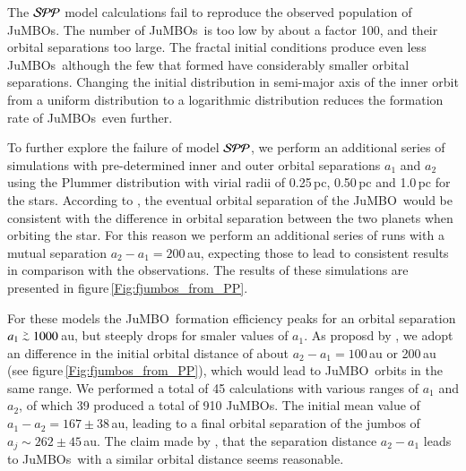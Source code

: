 \documentclass[aa]{lib/aa}
\def\apgt{\ {\raise-.5ex\hbox{$\buildrel>\over\sim$}}\ }
\newcommand{\jumbo}{\mbox{JuMBO}}
\newcommand{\jumbos}{\mbox{JuMBOs}}
\begin{document}
The ${\cal SPP}$ model calculations fail to reproduce the observed
population of \jumbos. The number of \jumbos\, is too low by about a
factor 100, and their orbital separations too large.  The fractal
initial conditions produce even less \jumbos\, although the few that
formed have considerably smaller orbital separations.  Changing the
initial distribution in semi-major axis of the inner orbit from a
uniform distribution to a logarithmic distribution reduces the
formation rate of \jumbos\, even further.

To further explore the failure of model ${\cal SPP}$, we perform an
additional series of simulations with pre-determined inner and outer
orbital separations $a_1$ and $a_2$ using the Plummer distribution
with virial radii of 0.25\,pc, 0.50\,pc and 1.0\,pc for the stars.
According to \cite{2023arXiv231006016W}, the eventual orbital
separation of the \jumbo\, would be consistent with the difference in
orbital separation between the two planets when orbiting the star. For
this reason we perform an additional series of runs with a mutual
separation $a_2-a_1 = 200$\,au, expecting those to lead to consistent
results in comparison with the observations.  The results of these
simulations are presented in figure\,\ref{Fig:fjumbos_from_PP}.

For these models the \jumbo\, formation efficiency peaks for an
orbital separation $a_1 \apgt 1000$\,au, but steeply drops for smaler
values of $a_1$. As proposd by \cite{2023arXiv231006016W}, we adopt an
difference in the initial orbital distance of about $a_2-a_1 =
100$\,au or 200\,au (see figure\,\ref{Fig:fjumbos_from_PP}), which
would lead to \jumbo\, orbits in the same range.  We performed a total
of 45 calculations with various ranges of $a_1$ and $a_2$, of which 39
produced a total of 910 \jumbos. The initial mean value of $a_1-a_2 =
167\pm38$\,au, leading to a final orbital separation of the jumbos of
$a_j \sim 262\pm45$\,au.  The claim made by
\cite{2023arXiv231006016W}, that the separation distance $a_2-a_1$
leads to \jumbos\, with a similar orbital distance seems reasonable.
\end{document}
